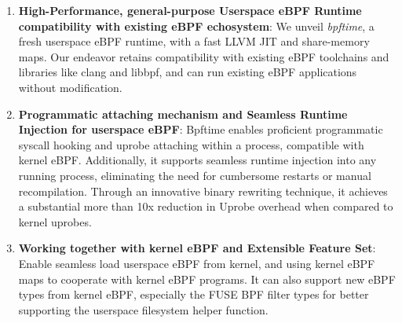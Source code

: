 
\begin{enumerate}
    \item \textbf{High-Performance, general-purpose Userspace eBPF Runtime compatibility with existing eBPF echosystem}: 
    We unveil \textit{bpftime}, a fresh userspace eBPF runtime, with a fast LLVM JIT and share-memory maps. Our endeavor retains compatibility with existing eBPF toolchains and libraries like clang and libbpf, and can run existing eBPF applications without modification.

    \item \textbf{Programmatic attaching mechanism and Seamless Runtime Injection for userspace eBPF}: 
    Bpftime enables proficient programmatic syscall hooking and uprobe attaching within a process, compatible with kernel eBPF. Additionally, it supports seamless runtime injection into any running process, eliminating the need for cumbersome restarts or manual recompilation. Through an innovative binary rewriting technique, it achieves a substantial more than 10x reduction in Uprobe overhead when compared to kernel uprobes.

    \item \textbf{Working together with kernel eBPF and Extensible Feature Set}: Enable seamless load userspace eBPF from kernel, and using kernel eBPF maps to cooperate with kernel eBPF programs. It can also support new eBPF types from kernel eBPF, especially the  FUSE BPF filter types for better supporting the userspace filesystem helper function.
\end{enumerate}


